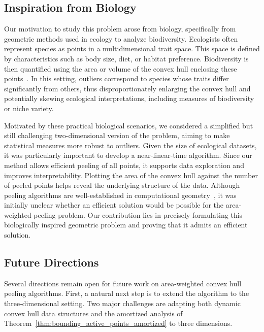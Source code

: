 
\subsection{Inspiration from Biology}
Our motivation to study this problem arose from biology, specifically from geometric methods used in ecology to analyze biodiversity. 
Ecologists often represent species as points in a multidimensional trait space. 
This space is defined by characteristics such as body size, diet, or habitat preference. 
Biodiversity is then quantified using the area or volume of the convex hull enclosing these points~\cite{Cornwell_biology, Layman_biology_2}. 
In this setting, outliers correspond to species whose traits differ significantly from others, thus disproportionately enlarging the convex hull and potentially skewing ecological interpretations, including measures of biodiversity or niche variety.

Motivated by these practical biological scenarios, we considered a simplified but still challenging two-dimensional version of the problem, aiming to make statistical measures more robust to outliers. 
Given the size of ecological datasets, it was particularly important to develop a near-linear-time algorithm. 
Since our method allows efficient peeling of all points, it supports data exploration and improves interpretability. 
Plotting the area of the convex hull against the number of peeled points helps reveal the underlying structure of the data.
Although peeling algorithms are well-established in computational geometry~\cite{loffler2014unions, peeling_layers1, shamos1978thesis, eppstein2025decremental}, it was initially unclear whether an efficient solution would be possible for the area-weighted peeling problem. 
Our contribution lies in precisely formulating this biologically inspired geometric problem and proving that it admits an efficient solution. 

\subsection{Future Directions}
Several directions remain open for future work on area-weighted convex hull peeling algorithms. 
First, a natural next step is to extend the algorithm to the three-dimensional setting. 
Two major challenges are adapting both dynamic convex hull data structures and the amortized analysis of Theorem~\ref{thm:bounding_active_points_amortized} to three dimensions. 


